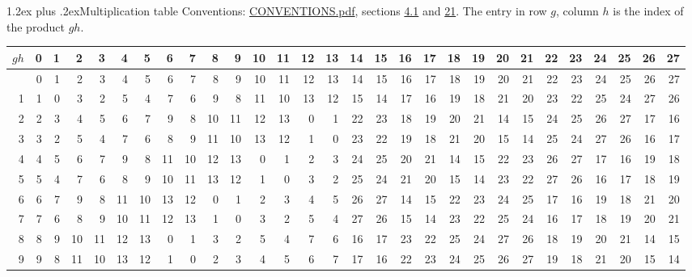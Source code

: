\documentclass[10pt,a4paper]{article}
\makeatletter
\renewcommand\section{\@startsection{section}{1}{\z@}{-3ex plus -1ex minus -.2ex}%
  {1.2ex plus .2ex}{\normalfont\large\sffamily\bfseries\color{parttitle}}}
\numberwithin{equation}{section}
\makeatother
\begin{document}
\section{Multiplication table}\label{s:multiplication}
Conventions: \href{../../CONVENTIONS.pdf}{CONVENTIONS.pdf}, sections \href{../../../rotation/CONVENTIONS.pdf\#conv.4.1}{4.1} and \href{../../CONVENTIONS.pdf\#conv.21}{21}.
The entry in row $g$, column $h$ is the index of the product $gh$.
{\normalsize\setlength{\tabcolsep}{0.1em}\setlength{\LTleft}{-8pt plus 1fill}\setlength{\LTright}{-8pt plus 1fill}\begin{longtable}{@{}r|rrrrrrrrrrrrrrrrrrrrrrrrrrrr@{}}\toprule
$gh$ & 0 & 1 & 2 & 3 & 4 & 5 & 6 & 7 & 8 & 9 & 10 & 11 & 12 & 13 & 14 & 15 & 16 & 17 & 18 & 19 & 20 & 21 & 22 & 23 & 24 & 25 & 26 & 27\\\midrule\endhead
\bottomrule\endfoot\endlastfoot
0 & 0 & 1 & 2 & 3 & 4 & 5 & 6 & 7 & 8 & 9 & 10 & 11 & 12 & 13 & 14 & 15 & 16 & 17 & 18 & 19 & 20 & 21 & 22 & 23 & 24 & 25 & 26 & 27\\*
1 & 1 & 0 & 3 & 2 & 5 & 4 & 7 & 6 & 9 & 8 & 11 & 10 & 13 & 12 & 15 & 14 & 17 & 16 & 19 & 18 & 21 & 20 & 23 & 22 & 25 & 24 & 27 & 26\\
2 & 2 & 3 & 4 & 5 & 6 & 7 & 9 & 8 & 10 & 11 & 12 & 13 & 0 & 1 & 22 & 23 & 18 & 19 & 20 & 21 & 14 & 15 & 24 & 25 & 26 & 27 & 17 & 16\\
3 & 3 & 2 & 5 & 4 & 7 & 6 & 8 & 9 & 11 & 10 & 13 & 12 & 1 & 0 & 23 & 22 & 19 & 18 & 21 & 20 & 15 & 14 & 25 & 24 & 27 & 26 & 16 & 17\\
4 & 4 & 5 & 6 & 7 & 9 & 8 & 11 & 10 & 12 & 13 & 0 & 1 & 2 & 3 & 24 & 25 & 20 & 21 & 14 & 15 & 22 & 23 & 26 & 27 & 17 & 16 & 19 & 18\\
5 & 5 & 4 & 7 & 6 & 8 & 9 & 10 & 11 & 13 & 12 & 1 & 0 & 3 & 2 & 25 & 24 & 21 & 20 & 15 & 14 & 23 & 22 & 27 & 26 & 16 & 17 & 18 & 19\\
6 & 6 & 7 & 9 & 8 & 11 & 10 & 13 & 12 & 0 & 1 & 2 & 3 & 4 & 5 & 26 & 27 & 14 & 15 & 22 & 23 & 24 & 25 & 17 & 16 & 19 & 18 & 21 & 20\\
7 & 7 & 6 & 8 & 9 & 10 & 11 & 12 & 13 & 1 & 0 & 3 & 2 & 5 & 4 & 27 & 26 & 15 & 14 & 23 & 22 & 25 & 24 & 16 & 17 & 18 & 19 & 20 & 21\\
8 & 8 & 9 & 10 & 11 & 12 & 13 & 0 & 1 & 3 & 2 & 5 & 4 & 7 & 6 & 16 & 17 & 23 & 22 & 25 & 24 & 27 & 26 & 18 & 19 & 20 & 21 & 14 & 15\\
9 & 9 & 8 & 11 & 10 & 13 & 12 & 1 & 0 & 2 & 3 & 4 & 5 & 6 & 7 & 17 & 16 & 22 & 23 & 24 & 25 & 26 & 27 & 19 & 18 & 21 & 20 & 15 & 14\\

\end{longtable}}
\end{document}
